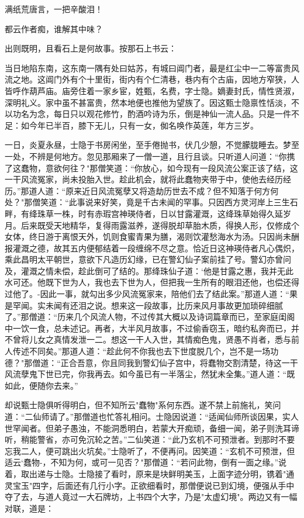满纸荒唐言，一把辛酸泪！

都云作者痴，谁解其中味？

出则既明，且看石上是何故事。按那石上书云：

当日地陷东南，这东南一隅有处曰姑苏，有城曰阊门者，最是红尘中一二等富贵风流之地。这阊门外有个十里街，街内有个仁清巷，巷内有个古庙，因地方窄狭，人皆呼作葫芦庙。庙旁住着一家乡宦，姓甄，名费，字士隐。嫡妻封氏，情性贤淑，深明礼义。家中虽不甚富贵，然本地便也推他为望族了。因这甄士隐禀性恬淡，不以功名为念，每日只以观花修竹，酌酒吟诗为乐，倒是神仙一流人品。只是一件不足：如今年已半百，膝下无儿，只有一女，侞名唤作英莲，年方三岁。

一日，炎夏永昼，士隐于书房闲坐，至手倦抛书，伏几少憩，不觉朦胧睡去。梦至一处，不辨是何地方。忽见那厢来了一僧一道，且行且谈。只听道人问道：“你携了这蠢物，意欲何往？"那僧笑道：“你放心，如今现有一段风流公案正该了结，这一干风流冤家，尚未投胎入世。趁此机会，就将此蠢物夹带于中，使他去经历经历。”那道人道：“原来近日风流冤孽又将造劫历世去不成？但不知落于何方何处？"那僧笑道：“此事说来好笑，竟是千古未闻的罕事。只因西方灵河岸上三生石畔，有绛珠草一株，时有赤瑕宫神瑛侍者，日以甘露灌溉，这绛珠草始得久延岁月。后来既受天地精华，复得雨露滋养，遂得脱却草胎木质，得换人形，仅修成个女体，终日游于离恨天外，饥则食蜜青果为膳，渴则饮灌愁海水为汤。只因尚未酬报灌溉之德，故其五内便郁结着一段缠绵不尽之意。恰近日这神瑛侍者凡心偶炽，乘此昌明太平朝世，意欲下凡造历幻缘，已在警幻仙子案前挂了号。警幻亦曾问及，灌溉之情未偿，趁此倒可了结的。那绛珠仙子道：`他是甘露之惠，我并无此水可还。他既下世为人，我也去下世为人，但把我一生所有的眼泪还他，也偿还得过他了。-因此一事，就勾出多少风流冤家来，陪他们去了结此案。”那道人道：“果是罕闻。实未闻有还泪之说。想来这一段故事，比历来风月事故更加琐碎细腻了。”那僧道：“历来几个风流人物，不过传其大概以及诗词篇章而已，至家庭闺阁中一饮一食，总未述记。再者，大半风月故事，不过偷香窃玉，暗约私奔而已，并不曾将儿女之真情发泄一二。想这一干人入世，其情痴色鬼，贤愚不肖者，悉与前人传述不同矣。”那道人道：“趁此何不你我也去下世度脱几个，岂不是一场功德？"那僧道：“正合吾意，你且同我到警幻仙子宫中，将蠢物交割清楚，待这一干风流孽鬼下世已完，你我再去。如今虽已有一半落尘，然犹未全集。”道人道：“既如此，便随你去来。”

却说甄士隐俱听得明白，但不知所云"蠢物"系何东西。遂不禁上前施礼，笑问道：“二仙师请了。”那僧道也忙答礼相问。士隐因说道：“适闻仙师所谈因果，实人世罕闻者。但弟子愚浊，不能洞悉明白，若蒙大开痴顽，备细一闻，弟子则洗耳谛听，稍能警省，亦可免沉轮之苦。”二仙笑道：“此乃玄机不可预泄者。到那时不要忘我二人，便可跳出火坑矣。”士隐听了，不便再问。因笑道：“玄机不可预泄，但适云`蠢物-，不知为何，或可一见否？"那僧道：“若问此物，倒有一面之缘。”说着，取出递与士隐。士隐接了看时，原来是块鲜明美玉，上面字迹分明，镌着"通灵宝玉"四字，后面还有几行小字。正欲细看时，那僧便说已到幻境，便强从手中夺了去，与道人竟过一大石牌坊，上书四个大字，乃是"太虚幻境"。两边又有一幅对联，道是：

